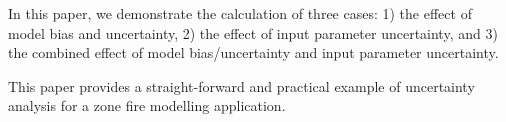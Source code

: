 
In this paper, we demonstrate the calculation of three cases: 1) the effect of model bias and uncertainty, 2) the effect of input parameter uncertainty, and 3) the combined effect of model bias/uncertainty and input parameter uncertainty.


This paper provides a straight-forward and practical example of uncertainty analysis for a zone fire modelling application. 